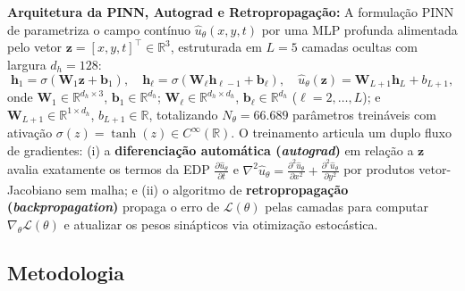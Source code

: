 \documentclass[a4paper, 12pt, twoside]{article}
\begin{document}
\textbf{Arquitetura da PINN, Autograd e Retropropagação:} A formulação PINN de \textcite{raissi2019pinns} parametriza o campo contínuo $\hat{u}_\theta(x, y, t)$ por uma MLP profunda alimentada pelo vetor $\mathbf{z} = [x, y, t]^\top \in \mathbb{R}^3$, estruturada em $L = 5$ camadas ocultas com largura $d_h = 128$:
\begin{equation}
    \mathbf{h}_1 = \sigma\left(\mathbf{W}_1 \mathbf{z} + \mathbf{b}_1\right), \quad \mathbf{h}_\ell = \sigma\left(\mathbf{W}_\ell \mathbf{h}_{\ell-1} + \mathbf{b}_\ell\right), \quad \hat{u}_\theta(\mathbf{z}) = \mathbf{W}_{L+1} \mathbf{h}_L + b_{L+1},
\end{equation}
onde $\mathbf{W}_1 \in \mathbb{R}^{d_h \times 3}$, $\mathbf{b}_1 \in \mathbb{R}^{d_h}$; $\mathbf{W}_\ell \in \mathbb{R}^{d_h \times d_h}$, $\mathbf{b}_\ell \in \mathbb{R}^{d_h}$ ($\ell = 2, \dots, L$); e $\mathbf{W}_{L+1} \in \mathbb{R}^{1 \times d_h}$, $b_{L+1} \in \mathbb{R}$, totalizando $N_\theta = 66.689$ parâmetros treináveis com ativação $\sigma(z) = \tanh(z) \in C^\infty(\mathbb{R})$. O treinamento articula um duplo fluxo de gradientes: (i) a \textbf{diferenciação automática (\textit{autograd})} em relação a $\mathbf{z}$ avalia exatamente os termos da EDP $\frac{\partial \hat{u}_\theta}{\partial t}$ e $\nabla^2 \hat{u}_\theta = \frac{\partial^2 \hat{u}_\theta}{\partial x^2} + \frac{\partial^2 \hat{u}_\theta}{\partial y^2}$ por produtos vetor-Jacobiano sem malha; e (ii) o algoritmo de \textbf{retropropagação (\textit{backpropagation})} propaga o erro de $\mathcal{L}(\theta)$ pelas camadas para computar $\nabla_\theta \mathcal{L}(\theta)$ e atualizar os pesos sinápticos via otimização estocástica.

\subsection{Metodologia}
\end{document}

